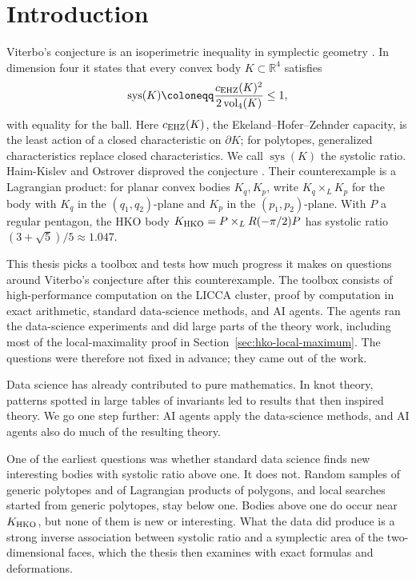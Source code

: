\section{Introduction}\label{sec:introduction}

Viterbo's conjecture is an isoperimetric inequality in symplectic geometry
\cite{Viterbo2000}. In dimension four it states that every convex body
$K\subset\mathbb R^4$ satisfies
\[
 \operatorname{sys}(K)\coloneqq\frac{c_{\rm EHZ}(K)^2}{2\operatorname{vol}_4(K)}\leq1,
\]
with equality for the ball. Here $c_{\rm EHZ}(K)$, the
Ekeland--Hofer--Zehnder capacity, is the least action of a closed
characteristic on $\partial K$; for polytopes, generalized characteristics
replace closed characteristics. We call $\operatorname{sys}(K)$ the systolic
ratio. Haim-Kislev and Ostrover disproved the conjecture
\cite{HaimKislevOstrover2024}. Their counterexample is a Lagrangian product:
for planar convex bodies $K_q,K_p$, write $K_q\times_L K_p$ for the body with
$K_q$ in the $(q_1,q_2)$-plane and $K_p$ in the $(p_1,p_2)$-plane. With $P$ a
regular pentagon, the HKO body $K_{\rm HKO}=P\times_L R(-\pi/2)P$ has
systolic ratio $(3+\sqrt5)/5\approx1.047$.

This thesis picks a toolbox and tests how much progress it makes on
questions around Viterbo's conjecture after this counterexample. The toolbox
consists of high-performance computation on the LICCA cluster,
proof by computation in exact arithmetic, standard data-science methods,
and AI agents. The agents ran the data-science experiments and did large
parts of the theory work, including most of the local-maximality proof in
Section~\ref{sec:hko-local-maximum}. The questions were therefore not fixed
in advance; they came out of the work.

Data science has already contributed to pure mathematics. In knot theory,
patterns spotted in large tables of invariants led to results that then
inspired theory. We go one step further: AI agents apply the data-science
methods, and AI agents also do much of the resulting theory.

One of the earliest questions was whether standard data science finds new
interesting bodies with systolic ratio above one. It does not. Random samples
of generic polytopes and of Lagrangian products of polygons, and local
searches started from generic polytopes, stay below one. Bodies above one do
occur near $K_{\rm HKO}$, but none of them is new or interesting.
What the data did produce is a strong inverse association between systolic
ratio and a symplectic area of the two-dimensional faces, which the thesis
then examines with exact formulas and deformations.

